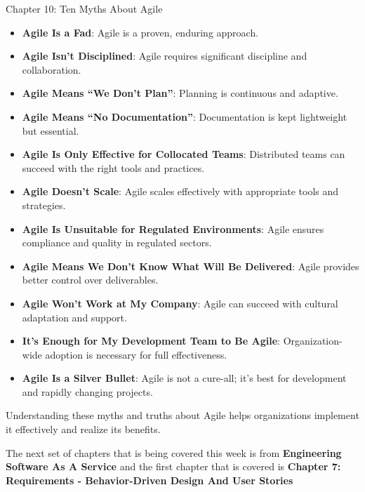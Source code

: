 \begin{notes}{Chapter 10: Ten Myths About Agile}
\begin{highlight}
        \begin{itemize}
            \item \textbf{Agile Is a Fad}: Agile is a proven, enduring approach.
            \item \textbf{Agile Isn't Disciplined}: Agile requires significant discipline and collaboration.
            \item \textbf{Agile Means “We Don't Plan”}: Planning is continuous and adaptive.
            \item \textbf{Agile Means “No Documentation”}: Documentation is kept lightweight but essential.
            \item \textbf{Agile Is Only Effective for Collocated Teams}: Distributed teams can succeed with the right tools and practices.
            \item \textbf{Agile Doesn't Scale}: Agile scales effectively with appropriate tools and strategies.
            \item \textbf{Agile Is Unsuitable for Regulated Environments}: Agile ensures compliance and quality in regulated sectors.
            \item \textbf{Agile Means We Don't Know What Will Be Delivered}: Agile provides better control over deliverables.
            \item \textbf{Agile Won't Work at My Company}: Agile can succeed with cultural adaptation and support.
            \item \textbf{It's Enough for My Development Team to Be Agile}: Organization-wide adoption is necessary for full effectiveness.
            \item \textbf{Agile Is a Silver Bullet}: Agile is not a cure-all; it's best for development and rapidly changing projects.
        \end{itemize}
        
        Understanding these myths and truths about Agile helps organizations implement it effectively and realize its benefits.
    
    \end{highlight}
\end{notes}

The next set of chapters that is being covered this week is from \textbf{Engineering Software As A Service} and the first chapter that is covered is \textbf{Chapter 7: Requirements - Behavior-Driven Design And User Stories}

